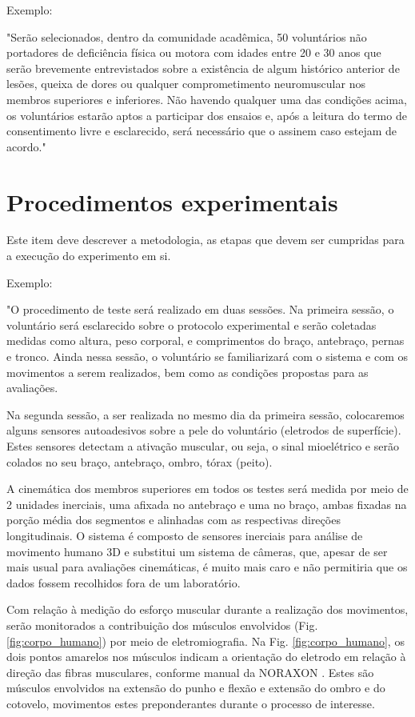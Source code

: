 \documentclass[rascunho,xindy]{Classe-Latex-FEI/fei}
\begin{document}
Exemplo:

"Serão selecionados, dentro da comunidade acadêmica, 50 voluntários não portadores de deficiência física ou motora com idades entre 20 e 30 anos que serão brevemente entrevistados sobre a existência de algum histórico anterior de lesões, queixa de dores ou qualquer comprometimento neuromuscular nos membros superiores e inferiores. Não havendo qualquer uma das condições acima, os voluntários estarão aptos a participar dos ensaios e, após a leitura do termo de consentimento livre e esclarecido, será necessário que o assinem caso estejam de acordo."

\section{Procedimentos experimentais}

Este item deve descrever a metodologia, as etapas que devem ser cumpridas para a execução do experimento em si.

Exemplo:

"O procedimento de teste será realizado em duas sessões. Na primeira sessão, o voluntário será esclarecido sobre o protocolo experimental e serão coletadas medidas como altura, peso corporal, e comprimentos do braço, antebraço, pernas e tronco. Ainda nessa sessão, o voluntário se familiarizará com o sistema e com os movimentos a serem realizados, bem como as condições propostas para as avaliações.

Na segunda sessão, a ser realizada no mesmo dia da primeira sessão, colocaremos alguns sensores autoadesivos sobre a pele do voluntário (eletrodos de superfície). Estes sensores detectam a ativação muscular, ou seja, o sinal mioelétrico e serão colados no seu braço, antebraço, ombro, tórax (peito).

A cinemática dos membros superiores em todos os testes será medida por meio de 2 unidades inerciais, uma afixada no antebraço e uma no braço, ambas fixadas na porção média dos segmentos e alinhadas com as respectivas direções longitudinais.  O sistema é composto de sensores inerciais para análise de movimento humano 3D e substitui um sistema de câmeras, que, apesar de ser mais usual para avaliações cinemáticas, é muito mais caro e não permitiria que os dados fossem recolhidos fora de um laboratório. 

Com relação à medição do esforço muscular durante a realização dos movimentos, serão monitorados a contribuição dos músculos envolvidos (Fig. \ref{fig:corpo_humano}) por meio de eletromiografia. Na Fig. \ref{fig:corpo_humano}, os dois pontos amarelos nos músculos indicam a orientação do eletrodo em relação à direção das fibras musculares, conforme manual da NORAXON \cite{konradabc}. Estes são músculos envolvidos na extensão do punho e flexão e extensão do ombro e do cotovelo, movimentos estes preponderantes durante o processo de interesse.
\end{document}
